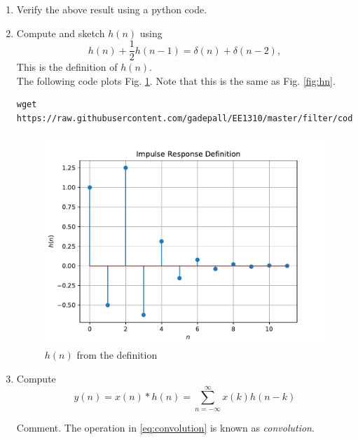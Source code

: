 \documentclass[journal,12pt,twocolumn]{IEEEtran}
\renewcommand\thesection{\arabic{section}}
\begin{document}
\begin{enumerate}[label=\thesection.\arabic*]
		\item Verify the above result using a python code.
		\item 
		Compute and sketch $h(n)$ using 
		\begin{equation}
			\label{eq:iir_filter_h}
			h(n) + \frac{1}{2}h(n-1) = \delta(n) + \delta(n-2), 
		\end{equation}
		This is the definition of $h(n)$.
		\\
		\solution The following code plots Fig. \ref{fig:hndef}. Note that this is the same as Fig. 
		\ref{fig:hn}. 
		\begin{lstlisting}
wget https://raw.githubusercontent.com/gadepall/EE1310/master/filter/codes/hndef.py
		\end{lstlisting}
		\begin{figure}[!ht]
			\centering
			\includegraphics[width=\columnwidth]{./figs/hndef}
			\caption{$h(n)$ from the definition}
			\label{fig:hndef}
		\end{figure}
		\item Compute 
		\begin{equation}
			\label{eq:convolution}
			y(n) = x(n)*h(n) = \sum_{n=-\infty}^{\infty}x(k)h(n-k)
		\end{equation}
		
		Comment. The operation in \eqref{eq:convolution} is known as
		{\em convolution}.
		

\end{enumerate}
\end{document}
